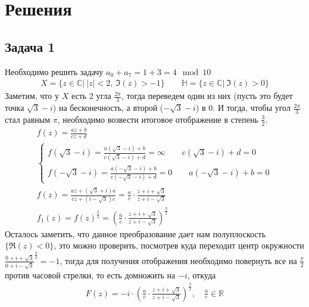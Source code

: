 
\newpage
\section*{Решения}
\subsection*{Задача 1}
	Необходимо решить задачу $a_0 + a_7 = 1 + 3 = 4 \mod 10$
	\begin{gather*}
		X = \{z \in \mathbb{C}|\ |z| < 2,\ \Im(z) > -1\}\qquad
		\mathbb{H} = \{z \in \mathbb{C}|\ \Im(z) > 0\}
	\end{gather*}
	Заметим, что у $X$ есть 2 угла $\frac{2\pi}{3}$, тогда переведем один из них (пусть это будет точка $\sqrt{3}-i$) на бесконечность, а второй ($-\sqrt{3}-i$) в 0. И тогда, чтобы угол $\frac{2\pi}{3}$ стал равным $\pi$, необходимо возвести итоговое отображение в степень $\frac{3}{2}$.
	\begin{gather*}
		f(z) = \frac{az + b}{cz + d}\\
		\begin{cases}
			f(\sqrt{3}-i) = \frac{a(\sqrt{3}-i) + b}{c(\sqrt{3}-i) + d} = \infty\qquad
			c(\sqrt{3}-i) + d = 0\\
			f(-\sqrt{3}-i) = \frac{a(-\sqrt{3}-i) + b}{c(-\sqrt{3}-i) + d} = 0\qquad
			a(-\sqrt{3}-i) + b = 0
		\end{cases}\\
		f(z) = \frac{az + (\sqrt{3}+i)a}{cz + (i - \sqrt{3})c}
		= \frac{a}{c}\cdot\frac{z + i + \sqrt{3}}{z + i - \sqrt{3}}\\
		f_1(z) = f(z)^{\frac{3}{2}}
		= \left(\frac{a}{c}\cdot\frac{z + i + \sqrt{3}}{z + i - \sqrt{3}}\right)^{\frac{3}{2}}
	\end{gather*}
	Осталось заметить, что данное преобразование дает нам полуплоскость $\{\Re(z) < 0\}$, это можно проверить, посмотрев куда переходит центр окружности $\frac{0 + i + \sqrt{3}}{0 + i - \sqrt{3}}^{\frac{3}{2}} = -1$, тогда для получения отображения необходимо повернуть все на $\frac{\pi}{2}$ против часовой стрелки, то есть домножить на $-i$, откуда
	\begin{gather*}
		F(z) = -i \cdot \left(\frac{a}{c}\cdot\frac{z + i + \sqrt{3}}{z + i - \sqrt{3}}\right)^{\frac{3}{2}},\quad \frac{a}{c} \in \mathbb{R}
	\end{gather*}
\vskip 0.4in

